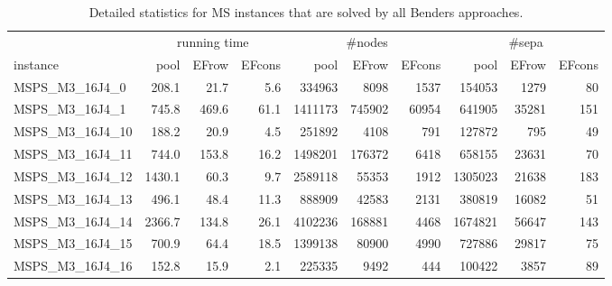 \documentclass[a4paper,10pt]{article}
\newcommand{\scheduling}{MS\xspace}
\theoremstyle{definition}
\begin{document}
\begin{table}[t]
  \caption{Detailed statistics for \scheduling instances that are solved by all Benders approaches.}
  \label{tab:fulloptsched}
  \centering
  \begin{scriptsize}
  \begin{tabular*}{\textwidth}{@{}l@{\;\;\extracolsep{\fill}}rrrrrrrrr@{}}
    \toprule
    & \multicolumn{3}{c}{running time} & \multicolumn{3}{c}{\#nodes} & \multicolumn{3}{c}{\#sepa}\\
    \cmidrule{2-4} \cmidrule{5-7} \cmidrule{8-10}
    instance & pool & EFrow & EFcons & pool & EFrow & EFcons & pool & EFrow & EFcons \\
    \midrule
 MSPS\_M3\_16J4\_0 & \num{ 208.1} & \num{  21.7} & \num{   5.6} & \num{    334963} & \num{      8098} & \num{      1537} & \num{    154053} & \num{      1279} & \num{        80}\\
 MSPS\_M3\_16J4\_1 & \num{ 745.8} & \num{ 469.6} & \num{  61.1} & \num{   1411173} & \num{    745902} & \num{     60954} & \num{    641905} & \num{     35281} & \num{       151}\\
MSPS\_M3\_16J4\_10 & \num{ 188.2} & \num{  20.9} & \num{   4.5} & \num{    251892} & \num{      4108} & \num{       791} & \num{    127872} & \num{       795} & \num{        49}\\
MSPS\_M3\_16J4\_11 & \num{ 744.0} & \num{ 153.8} & \num{  16.2} & \num{   1498201} & \num{    176372} & \num{      6418} & \num{    658155} & \num{     23631} & \num{        70}\\
MSPS\_M3\_16J4\_12 & \num{1430.1} & \num{  60.3} & \num{   9.7} & \num{   2589118} & \num{     55353} & \num{      1912} & \num{   1305023} & \num{     21638} & \num{       183}\\
MSPS\_M3\_16J4\_13 & \num{ 496.1} & \num{  48.4} & \num{  11.3} & \num{    888909} & \num{     42583} & \num{      2131} & \num{    380819} & \num{     16082} & \num{        51}\\
MSPS\_M3\_16J4\_14 & \num{2366.7} & \num{ 134.8} & \num{  26.1} & \num{   4102236} & \num{    168881} & \num{      4468} & \num{   1674821} & \num{     56647} & \num{       143}\\
MSPS\_M3\_16J4\_15 & \num{ 700.9} & \num{  64.4} & \num{  18.5} & \num{   1399138} & \num{     80900} & \num{      4990} & \num{    727886} & \num{     29817} & \num{        75}\\
MSPS\_M3\_16J4\_16 & \num{ 152.8} & \num{  15.9} & \num{   2.1} & \num{    225335} & \num{      9492} & \num{       444} & \num{    100422} & \num{      3857} & \num{        89}\\

\end{tabular*}
\end{scriptsize}
\end{table}
\end{document}
